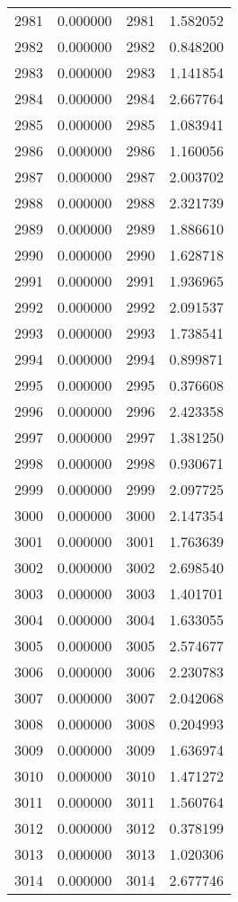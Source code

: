 \documentclass[12pt]{article}
\begin{document}
\begin{longtable}{@{}cccc@{}}
2981 & 0.000000 & 2981 & 1.582052 \\
2982 & 0.000000 & 2982 & 0.848200 \\
2983 & 0.000000 & 2983 & 1.141854 \\
2984 & 0.000000 & 2984 & 2.667764 \\
2985 & 0.000000 & 2985 & 1.083941 \\
2986 & 0.000000 & 2986 & 1.160056 \\
2987 & 0.000000 & 2987 & 2.003702 \\
2988 & 0.000000 & 2988 & 2.321739 \\
2989 & 0.000000 & 2989 & 1.886610 \\
2990 & 0.000000 & 2990 & 1.628718 \\
2991 & 0.000000 & 2991 & 1.936965 \\
2992 & 0.000000 & 2992 & 2.091537 \\
2993 & 0.000000 & 2993 & 1.738541 \\
2994 & 0.000000 & 2994 & 0.899871 \\
2995 & 0.000000 & 2995 & 0.376608 \\
2996 & 0.000000 & 2996 & 2.423358 \\
2997 & 0.000000 & 2997 & 1.381250 \\
2998 & 0.000000 & 2998 & 0.930671 \\
2999 & 0.000000 & 2999 & 2.097725 \\
3000 & 0.000000 & 3000 & 2.147354 \\
3001 & 0.000000 & 3001 & 1.763639 \\
3002 & 0.000000 & 3002 & 2.698540 \\
3003 & 0.000000 & 3003 & 1.401701 \\
3004 & 0.000000 & 3004 & 1.633055 \\
3005 & 0.000000 & 3005 & 2.574677 \\
3006 & 0.000000 & 3006 & 2.230783 \\
3007 & 0.000000 & 3007 & 2.042068 \\
3008 & 0.000000 & 3008 & 0.204993 \\
3009 & 0.000000 & 3009 & 1.636974 \\
3010 & 0.000000 & 3010 & 1.471272 \\
3011 & 0.000000 & 3011 & 1.560764 \\
3012 & 0.000000 & 3012 & 0.378199 \\
3013 & 0.000000 & 3013 & 1.020306 \\
3014 & 0.000000 & 3014 & 2.677746 \\

\end{longtable}
\end{document}

